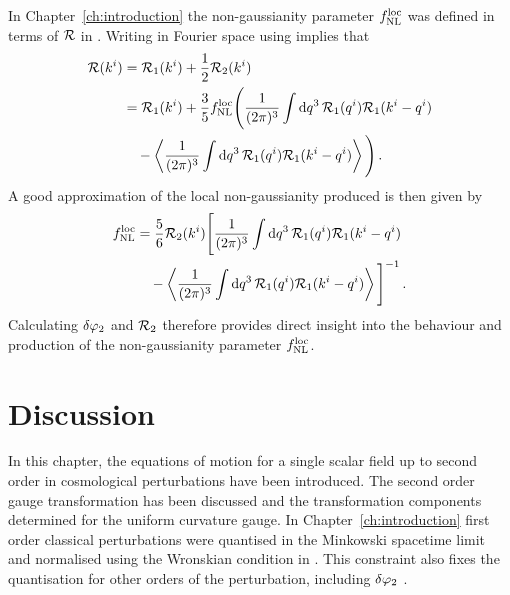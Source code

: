 In Chapter~\ref{ch:introduction} the non-gaussianity parameter $f_{\mathrm{NL}}^\mathrm{loc}$ was defined
in terms of $\mathcal{R}$ in . Writing  in
Fourier space using  implies that
% 
\begin{align}
 \R(\kvi) &= \R_1(\kvi) + \frac{1}{2}\R_2(\kvi) \nonumber \\
% 
 &= \R_1(\kvi)
  + \frac{3}{5}\fnlloc \Bigg( \frac{1}{(2\pi)^3}\int \d q^3\, \R_1(\qvi)
\R_1(\kvi-\qvi) \\ \nonumber
% 
  &\quad- \left\langle \frac{1}{(2\pi)^3} \int \d q^3\, \R_1(\qvi)
\R_1(\kvi-\qvi) \right\rangle \Bigg) \,.
\end{align}
% 
A good approximation of the local non-gaussianity produced is then given by
% 
\begin{align}
 \label{eq:fnlloc-perts}
\fnlloc &= \frac{5}{6} \R_2(\kvi) \Bigg[ \frac{1}{(2\pi)^3}\int \d q^3\, \R_1(\qvi)
\R_1(\kvi-\qvi) \\ \nonumber
% 
  &\quad- \left\langle \frac{1}{(2\pi)^3} \int \d q^3\, \R_1(\qvi)
\R_1(\kvi-\qvi) \right\rangle \Bigg]^{-1} \,.
\end{align}
% 
Calculating $\delta\varphi_{2}$ and $\mathcal{R}_2$ therefore provides direct insight into the behaviour
and
production of the non-gaussianity parameter $f_{\mathrm{NL}}^\mathrm{loc}$. 

% 
% 
% 
% 
\section{Discussion}
\label{sec:disc-perts}

In this chapter, the equations of motion for a single scalar
field
up to second order in cosmological perturbations have been introduced. The second
order gauge
transformation has been discussed and the transformation components determined for
the uniform curvature gauge.
% 
In Chapter~\ref{ch:introduction} first order classical perturbations were quantised
in the Minkowski spacetime limit and normalised using the Wronskian condition in
. This constraint also fixes the quantisation for other
orders of the perturbation, including $\delta\varphi_{2}$ \cite{Seery:2008qj}. 

